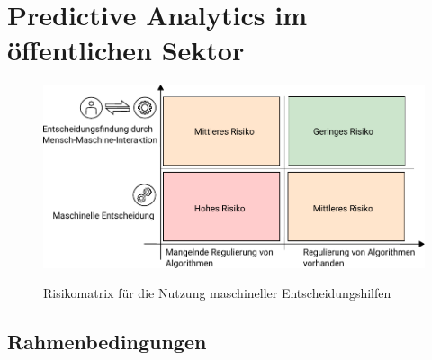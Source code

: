 \documentclass[12pt,a4paper,listof=totoc,oneside]{scrreprt}
\begin{document}










\setcounter{page}{1}
\tableofcontents






\chapter{Predictive Analytics im öffentlichen Sektor}


\begin{figure}%
\centering
\caption{Risikomatrix für die Nutzung maschineller Entscheidungshilfen}
\includegraphics[scale=1.0]{Grafiken/Risk_Matrix_Ink.pdf} 
\label{pic:Risiko_Matrix}
\end{figure}

\section{Rahmenbedingungen}

\end{document}
